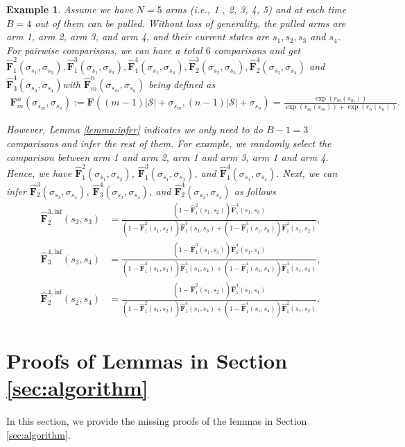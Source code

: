 \documentclass{article} %
\newcommand{\I}{\sigma}
\newcommand{\bF}{\mathbf{F}}
\newcommand{\cS}{\mathcal{S}}
\newtheorem{exmp}{Example}
\begin{document}
{\begin{exmp}\label{example:B-1}
Assume we have $N=5$ arms (i.e., 1 , 2, 3, 4, 5) and at each time $B=4$ out of them can be pulled. Without loss of generality, the pulled arms are arm 1, arm 2, arm 3, and arm 4, and their current states are $s_1, s_2, s_3$ and  $s_4$. For pairwise comparisons, we can have a total $6$ comparisons and get $\hat{\bF}_1^2(\I_{s_1},\I_{s_2}), \hat{\bF}_1^3(\I_{s_1},\I_{s_3}), \hat{\bF}_1^4(\I_{s_1},\I_{s_4}), \hat{\bF}_2^3(\I_{s_2},\I_{s_3}), \hat{\bF}_2^4(\I_{s_2},\I_{s_4})$ and $\hat{\bF}_3^4(\I_{s_3},\I_{s_4})$with $\hat{\bF}_m^n(\I_{s_m},\I_{s_n})$ being defined as 
\begin{align*} \bF_m^n(\I_{s_m},\I_{s_n}) :=\bF((m-1)|\cS|+\I_{s_{m}},(n-1)|\cS|+\I_{s_{n}})=\frac{\exp(r_m(s_{m}))}{\exp(r_m(s_{m}))+\exp(r_n(s_{n}))}.
\end{align*}

However, Lemma \ref{lemma:infer} indicates we only need to do $B-1=3$ comparisons and infer the rest of them. For example, we randomly select the comparison between arm 1 and arm 2, arm 1 and arm 3, arm 1 and arm 4. Hence, we have   $\hat{\bF}_1^2(\I_{s_1},\I_{s_2})$, $\hat{\bF}_1^3(\I_{s_1},\I_{s_3})$, and $\hat{\bF}_1^4(\I_{s_1},\I_{s_4})$. Next, we can infer $\hat{\bF}_2^3(\I_{s_2},\I_{s_3})$, $\hat{\bF}_3^4(\I_{s_3},\I_{s_4})$, and $\hat{\bF}_2^4(\I_{s_2},\I_{s_4})$ as follows
\begin{align*}
    \hat{\bF}_2^{3,\text{inf}}(s_2, s_3)
    &=\frac{(1-\hat{\bF}_1^2(s_1,s_2))\hat{\bF}_1^3(s_1,s_3)}{(1-\hat{\bF}_1^2(s_1,s_2))\hat{\bF}_1^3(s_1,s_3)+(1-\hat{\bF}_1^3(s_1,s_3))\hat{\bF}_1^2(s_1,s_2)},\\
    \hat{\bF}_3^{4,\text{inf}}(s_3, s_4)
    &=\frac{(1-\hat{\bF}_1^3(s_1,s_3))\hat{\bF}_1^4(s_1,s_4)}{(1-\hat{\bF}_1^3(s_1,s_3))\hat{\bF}_1^4(s_1,s_4)+(1-\hat{\bF}_1^4(s_1,s_4))\hat{\bF}_1^3(s_1,s_3)},\\
    \hat{\bF}_2^{4,\text{inf}}(s_2, s_4)
    &=\frac{(1-\hat{\bF}_1^2(s_1,s_2))\hat{\bF}_1^4(s_1,s_4)}{(1-\hat{\bF}_1^2(s_1,s_2))\hat{\bF}_1^4(s_1,s_4)+(1-\hat{\bF}_1^4(s_1,s_4))\hat{\bF}_1^2(s_1,s_2)}.
\end{align*}
\end{exmp}








\section{Proofs of Lemmas in Section \ref{sec:algorithm}}
In this section, we provide the missing proofs of the lemmas in Section \ref{sec:algorithm}.
}
\end{document}
